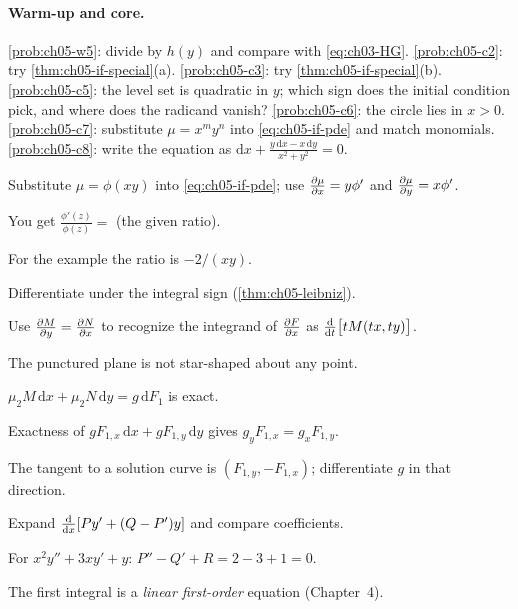 \paragraph{Warm-up and core.}
\cref{prob:ch05-w5}: divide by $h(y)$ and compare with \eqref{eq:ch03-HG}.
\cref{prob:ch05-c2}: try \cref{thm:ch05-if-special}(a).
\cref{prob:ch05-c3}: try \cref{thm:ch05-if-special}(b).
\cref{prob:ch05-c5}: the level set is quadratic in $y$; which sign does the
initial condition pick, and where does the radicand vanish?
\cref{prob:ch05-c6}: the circle lies in $x>0$.
\cref{prob:ch05-c7}: substitute $\mu = x^my^n$ into \eqref{eq:ch05-if-pde} and
match monomials.
\cref{prob:ch05-c8}: write the equation as
$\mathrm{d}x + \frac{y\,\mathrm{d}x - x\,\mathrm{d}y}{x^2+y^2} = 0$.

\begin{hintlevels}
  \item Substitute $\mu = \phi(xy)$ into \eqref{eq:ch05-if-pde}; use
        $\frac{\partial \mu}{\partial x} = y\phi'$ and $\frac{\partial \mu}{\partial y} = x\phi'$.
  \item You get $\frac{\phi'(z)}{\phi(z)} = $ (the given ratio).
  \item For the example the ratio is $-2/(xy)$.
\end{hintlevels}

\begin{hintlevels}
  \item Differentiate under the integral sign (\cref{thm:ch05-leibniz}).
  \item Use $\frac{\partial M}{\partial y} = \frac{\partial N}{\partial x}$ to recognize the integrand of
        $\frac{\partial F}{\partial x}$ as $\frac{\mathrm{d}}{\mathrm{d}t}\bigl[tM(tx,ty)\bigr]$.
  \item The punctured plane is not star-shaped about any point.
\end{hintlevels}

\begin{hintlevels}
  \item $\mu_2M\,\mathrm{d}x + \mu_2N\,\mathrm{d}y = g\,\mathrm{d}F_1$ is exact.
  \item Exactness of $gF_{1,x}\,\mathrm{d}x + gF_{1,y}\,\mathrm{d}y$ gives
        $g_yF_{1,x} = g_xF_{1,y}$.
  \item The tangent to a solution curve is $(F_{1,y}, -F_{1,x})$; differentiate
        $g$ in that direction.
\end{hintlevels}

\begin{hintlevels}
  \item Expand $\frac{\mathrm{d}}{\mathrm{d}x}[Py' + (Q-P')y]$ and compare coefficients.
  \item For $x^2y'' + 3xy' + y$: $P'' - Q' + R = 2 - 3 + 1 = 0$.
  \item The first integral is a \emph{linear first-order} equation (Chapter~4).
\end{hintlevels}

